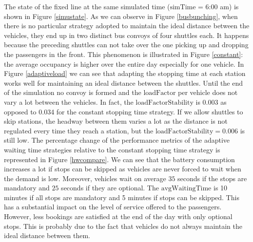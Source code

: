\documentclass[12pt,a4paper]{article}
\begin{document}
The state of the fixed line at the same simulated time ($\text{simTime}$ = 6:00 am) is shown in Figure \ref{simustate}. As we can observe in Figure \ref{busbunching}, when there is no particular strategy adopted to maintain the ideal distance between the vehicles, they end up in two distinct bus convoys of four shuttles each. It happens because the preceding shuttles can not take over the one picking up and dropping the passengers in the front. This phenomenon is illustrated in Figure \ref{constant}: the average occupancy is higher over the entire day especially for one vehicle. In Figure \ref{adaptiveload} we can see that adapting the stopping time at each station works well for maintaining an ideal distance between the shuttles. Until the end of the simulation no convoy is formed and the $\text{loadFactor}$ per vehicle does not vary a lot between the vehicles. In fact, the $\text{loadFactorStability}$ is 0.003 as opposed to 0.034 for the constant stopping time strategy. If we allow shuttles to skip stations, the headway between them varies a lot as the distance is not regulated every time they reach a station, but the $\text{loadFactorStability} =  0.006$ is still low. The percentage change of the performance metrics of the adaptive waiting time strategies relative to the constant stopping time strategy is represented in Figure \ref{hwcompare}. We can see that the battery consumption increases a lot if stops can be skipped as vehicles are never forced to wait when the demand is low. Moreover, vehicles wait on average $35$ seconds if the stops are mandatory and $25$ seconds if they are optional. The $\text{avgWaitingTime}$ is 10 minutes if all stops are mandatory and 5 minutes if stops can be skipped. This has a substantial impact on the level of service offered to the passengers. However, less bookings are satisfied at the end of the day with only optional stops. This is probably due to the fact that vehicles do not always maintain the ideal distance between them. 
\end{document}

